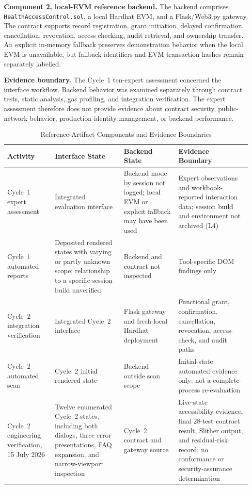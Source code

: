 \documentclass[journal]{IEEEtran}
\begin{document}
\noindent\textbf{Component 2, local-EVM reference backend.}
The backend comprises \texttt{HealthAccessControl.sol}, a local Hardhat EVM, and a Flask/Web3.py gateway. The contract supports record registration, grant initiation, delayed confirmation, cancellation, revocation, access checking, audit retrieval, and ownership transfer. An explicit in-memory fallback preserves demonstration behavior when the local EVM is unavailable, but fallback identifiers and EVM transaction hashes remain separately labelled.

\noindent\textbf{Evidence boundary.}
The Cycle~1 ten-expert assessment concerned the interface workflow. Backend behavior was examined separately through contract tests, static analysis, gas profiling, and integration verification. The expert assessment therefore does not provide evidence about contract security, public-network behavior, production identity management, or backend performance.

\begin{table}[!t]
\caption{Reference-Artifact Components and Evidence Boundaries}
\label{tab:artifact-boundary}
\centering
\footnotesize
\begin{tabularx}{\textwidth}{p{}p{}p{}X}
\toprule
\textbf{Activity} & \textbf{Interface State} & \textbf{Backend State} & \textbf{Evidence Boundary} \\
\midrule
Cycle~1 expert assessment & Integrated evaluation interface & Backend mode by session not logged; local EVM or explicit fallback may have been used & Expert observations and workbook-reported interaction data; session build and environment not archived (L4) \\
Cycle~1 automated reports & Deposited rendered states with varying or partly unknown scope; relationship to a specific session build unverified & Backend and contract not inspected & Tool-specific DOM findings only \\
Cycle~2 integration verification & Integrated Cycle~2 interface & Flask gateway and fresh local Hardhat deployment & Functional grant, confirmation, cancellation, revocation, access-check, and audit paths \\
Cycle~2 automated scan & Cycle~2 initial rendered state & Backend outside scan scope & Initial-state automated evidence only; not a complete-process re-evaluation \\
Cycle~2 engineering verification, 15 July 2026 & Twelve enumerated Cycle~2 states, including both dialogs, three error presentations, FAQ expansion, and narrow-viewport inspection & Cycle~2 contract and gateway source & Live-state accessibility evidence, final 28-test contract result, Slither output, and residual-risk record; no conformance or security-assurance determination \\
\bottomrule
\end{tabularx}
\end{table}
\end{document}
